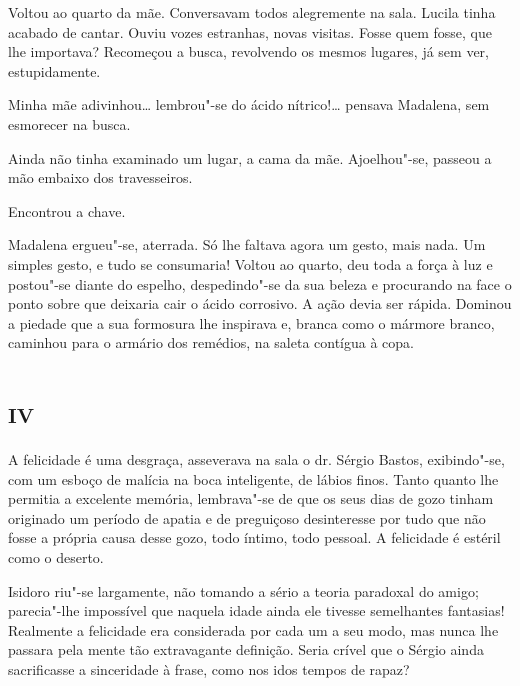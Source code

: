 Voltou ao quarto da mãe. Conversavam todos alegremente na sala. Lucila
tinha acabado de cantar. Ouviu vozes estranhas, novas visitas. Fosse
quem fosse, que lhe importava? Recomeçou a busca, revolvendo os mesmos
lugares, já sem ver, estupidamente.

Minha mãe adivinhou\ldots{} lembrou"-se do ácido nítrico!\ldots{} pensava Madalena,
sem esmorecer na busca.

Ainda não tinha examinado um lugar, a cama da mãe. Ajoelhou"-se, passeou
a mão embaixo dos travesseiros.

Encontrou a chave.

Madalena ergueu"-se, aterrada. Só lhe faltava agora um gesto, mais nada.
Um simples gesto, e tudo se consumaria! Voltou ao quarto, deu toda a
força à luz e postou"-se diante do espelho, despedindo"-se da sua beleza e
procurando na face o ponto sobre que deixaria cair o ácido corrosivo. A
ação devia ser rápida. Dominou a piedade que a sua formosura lhe
inspirava e, branca como o mármore branco, caminhou para o armário dos
remédios, na saleta contígua à copa.

\section*{\textsc{iv}}

A felicidade é uma desgraça, asseverava na sala o dr. Sérgio Bastos,
exibindo"-se, com um esboço de malícia na boca inteligente, de lábios
finos. Tanto quanto lhe permitia a excelente memória, lembrava"-se de que
os seus dias de gozo tinham originado um período de apatia e de
preguiçoso desinteresse por tudo que não fosse a própria causa desse
gozo, todo íntimo, todo pessoal. A felicidade é estéril como o deserto.

Isidoro riu"-se largamente, não tomando a sério a teoria paradoxal do
amigo; parecia"-lhe impossível que naquela idade ainda ele tivesse
semelhantes fantasias! Realmente a felicidade era considerada por cada
um a seu modo, mas nunca lhe passara pela mente tão extravagante
definição. Seria crível que o Sérgio ainda sacrificasse a sinceridade à
frase, como nos idos tempos de rapaz?

